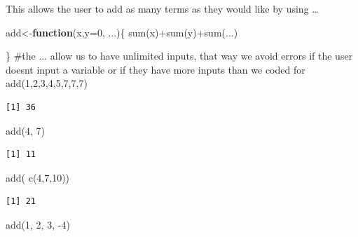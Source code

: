 \documentclass[
  letterpaper,
  DIV=11,
  numbers=noendperiod]{scrartcl}
\newenvironment{Shaded}{\begin{snugshade}}{\end{snugshade}}
\newcommand{\AttributeTok}[1]{\textcolor[rgb]{0.40,0.45,0.13}{#1}}
\newcommand{\CommentTok}[1]{\textcolor[rgb]{0.37,0.37,0.37}{#1}}
\newcommand{\ControlFlowTok}[1]{\textcolor[rgb]{0.00,0.23,0.31}{\textbf{#1}}}
\newcommand{\DecValTok}[1]{\textcolor[rgb]{0.68,0.00,0.00}{#1}}
\newcommand{\FunctionTok}[1]{\textcolor[rgb]{0.28,0.35,0.67}{#1}}
\newcommand{\NormalTok}[1]{\textcolor[rgb]{0.00,0.23,0.31}{#1}}
\newcommand{\OtherTok}[1]{\textcolor[rgb]{0.00,0.23,0.31}{#1}}
\newcommand{\SpecialCharTok}[1]{\textcolor[rgb]{0.37,0.37,0.37}{#1}}
\begin{document}
This allows the user to add as many terms as they would like by using
\ldots{}

\begin{Shaded}
\begin{Highlighting}[]
\NormalTok{add}\OtherTok{\textless{}{-}}\ControlFlowTok{function}\NormalTok{(x,}\AttributeTok{y=}\DecValTok{0}\NormalTok{, ...)\{}
  \FunctionTok{sum}\NormalTok{(x)}\SpecialCharTok{+}\FunctionTok{sum}\NormalTok{(y)}\SpecialCharTok{+}\FunctionTok{sum}\NormalTok{(...)}
  
\NormalTok{\}}
\CommentTok{\#the ... allow us to have unlimited inputs, that way we avoid errors if the user doesn\textquotesingle{}t input a variable or if they have more inputs than we coded for}
\FunctionTok{add}\NormalTok{(}\DecValTok{1}\NormalTok{,}\DecValTok{2}\NormalTok{,}\DecValTok{3}\NormalTok{,}\DecValTok{4}\NormalTok{,}\DecValTok{5}\NormalTok{,}\DecValTok{7}\NormalTok{,}\DecValTok{7}\NormalTok{,}\DecValTok{7}\NormalTok{)}
\end{Highlighting}
\end{Shaded}

\begin{verbatim}
[1] 36
\end{verbatim}

\begin{Shaded}
\begin{Highlighting}[]
\FunctionTok{add}\NormalTok{(}\DecValTok{4}\NormalTok{, }\DecValTok{7}\NormalTok{)}
\end{Highlighting}
\end{Shaded}

\begin{verbatim}
[1] 11
\end{verbatim}

\begin{Shaded}
\begin{Highlighting}[]
\FunctionTok{add}\NormalTok{( }\FunctionTok{c}\NormalTok{(}\DecValTok{4}\NormalTok{,}\DecValTok{7}\NormalTok{,}\DecValTok{10}\NormalTok{))}
\end{Highlighting}
\end{Shaded}

\begin{verbatim}
[1] 21
\end{verbatim}

\begin{Shaded}
\begin{Highlighting}[]
\FunctionTok{add}\NormalTok{(}\DecValTok{1}\NormalTok{, }\DecValTok{2}\NormalTok{, }\DecValTok{3}\NormalTok{, }\SpecialCharTok{{-}}\DecValTok{4}\NormalTok{)}
\end{Highlighting}
\end{Shaded}
\end{document}
